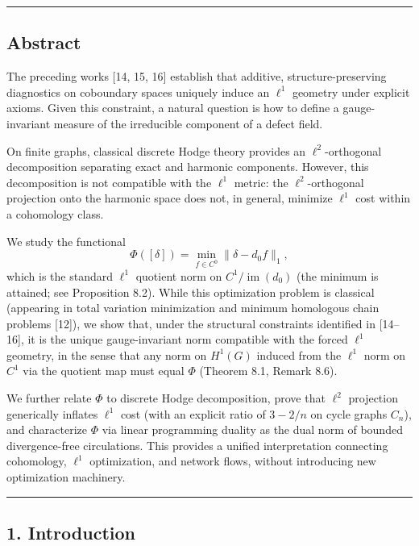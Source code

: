 \documentclass[
]{article}
\begin{document}
\begin{center}\rule{0.5\linewidth}{0.5pt}\end{center}

\subsection{Abstract}\label{abstract}

The preceding works {[}14, 15, 16{]} establish that additive,
structure-preserving diagnostics on coboundary spaces uniquely induce an
\(\ell^1\) geometry under explicit axioms. Given this constraint, a
natural question is how to define a gauge-invariant measure of the
irreducible component of a defect field.

On finite graphs, classical discrete Hodge theory provides an
\(\ell^2\)-orthogonal decomposition separating exact and harmonic
components. However, this decomposition is not compatible with the
\(\ell^1\) metric: the \(\ell^2\)-orthogonal projection onto the
harmonic space does not, in general, minimize \(\ell^1\) cost within a
cohomology class.

We study the functional \[
\Phi([\delta]) = \min_{f \in C^0} \|\delta - d_0 f\|_1,
\] which is the standard \(\ell^1\) quotient norm on
\(C^1 / \operatorname{im}(d_0)\) (the minimum is attained; see
Proposition 8.2). While this optimization problem is classical
(appearing in total variation minimization and minimum homologous chain
problems {[}12{]}), we show that, under the structural constraints
identified in {[}14--16{]}, it is the unique gauge-invariant norm
compatible with the forced \(\ell^1\) geometry, in the sense that any
norm on \(H^1(G)\) induced from the \(\ell^1\) norm on \(C^1\) via the
quotient map must equal \(\Phi\) (Theorem 8.1, Remark 8.6).

We further relate \(\Phi\) to discrete Hodge decomposition, prove that
\(\ell^2\) projection generically inflates \(\ell^1\) cost (with an
explicit ratio of \(3 - 2/n\) on cycle graphs \(C_n\)), and characterize
\(\Phi\) via linear programming duality as the dual norm of bounded
divergence-free circulations. This provides a unified interpretation
connecting cohomology, \(\ell^1\) optimization, and network flows,
without introducing new optimization machinery.

\begin{center}\rule{0.5\linewidth}{0.5pt}\end{center}

\subsection{1. Introduction}\label{introduction}
\end{document}
